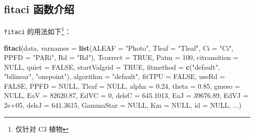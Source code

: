\documentclass[]{krantz}
\makeatletter
\newenvironment{Shaded}{\begin{snugshade}}{\end{snugshade}}
\newcommand{\KeywordTok}[1]{\textcolor[rgb]{0.13,0.29,0.53}{\textbf{#1}}}
\newcommand{\DataTypeTok}[1]{\textcolor[rgb]{0.13,0.29,0.53}{#1}}
\newcommand{\DecValTok}[1]{\textcolor[rgb]{0.00,0.00,0.81}{#1}}
\newcommand{\FloatTok}[1]{\textcolor[rgb]{0.00,0.00,0.81}{#1}}
\newcommand{\StringTok}[1]{\textcolor[rgb]{0.31,0.60,0.02}{#1}}
\newcommand{\OtherTok}[1]{\textcolor[rgb]{0.56,0.35,0.01}{#1}}
\newcommand{\NormalTok}[1]{#1}
\newenvironment{kframe}{%
\medskip{}
\setlength{\fboxsep}{.8em}
 \def\at@end@of@kframe{}%
 \ifinner\ifhmode%
  \def\at@end@of@kframe{\end{minipage}}%
  \begin{minipage}{\columnwidth}%
 \fi\fi%
 \def\FrameCommand##1{\hskip\@totalleftmargin \hskip-\fboxsep
 \colorbox{shadecolor}{##1}\hskip-\fboxsep
     \hskip-\linewidth \hskip-\@totalleftmargin \hskip\columnwidth}%
 \MakeFramed {\advance\hsize-\width
   \@totalleftmargin\z@ \linewidth\hsize
   \@setminipage}}%
 {\par\unskip\endMakeFramed%
 \at@end@of@kframe}
\renewenvironment{Shaded}{\begin{kframe}}{\end{kframe}}
\theoremstyle{definition}
\theoremstyle{definition}
\theoremstyle{definition}
\theoremstyle{remark}
\makeatother
\begin{document}
\subsection{fitaci 函数介绍}\label{fitaci_intro}

\texttt{fitaci} 的用法如下\footnote{仅针对 C3 植物}：

\begin{Shaded}
\begin{Highlighting}[]
\KeywordTok{fitaci}\NormalTok{(data, }\DataTypeTok{varnames =} \KeywordTok{list}\NormalTok{(}\DataTypeTok{ALEAF =} \StringTok{"Photo"}\NormalTok{, }
  \DataTypeTok{Tleaf =} \StringTok{"Tleaf"}\NormalTok{, }\DataTypeTok{Ci =} \StringTok{"Ci"}\NormalTok{, }\DataTypeTok{PPFD =} \StringTok{"PARi"}\NormalTok{, }
  \DataTypeTok{Rd =} \StringTok{"Rd"}\NormalTok{), }\DataTypeTok{Tcorrect =} \OtherTok{TRUE}\NormalTok{, }\DataTypeTok{Patm =} \DecValTok{100}\NormalTok{, }
  \DataTypeTok{citransition =} \OtherTok{NULL}\NormalTok{, }\DataTypeTok{quiet =} \OtherTok{FALSE}\NormalTok{, }
  \DataTypeTok{startValgrid =} \OtherTok{TRUE}\NormalTok{, }\DataTypeTok{fitmethod =} 
  \KeywordTok{c}\NormalTok{(}\StringTok{"default"}\NormalTok{, }\StringTok{"bilinear"}\NormalTok{, }\StringTok{"onepoint"}\NormalTok{), }
  \DataTypeTok{algorithm =} \StringTok{"default"}\NormalTok{, }\DataTypeTok{fitTPU =} \OtherTok{FALSE}\NormalTok{, }
  \DataTypeTok{useRd =} \OtherTok{FALSE}\NormalTok{, }\DataTypeTok{PPFD =} \OtherTok{NULL}\NormalTok{, }\DataTypeTok{Tleaf =} \OtherTok{NULL}\NormalTok{, }
  \DataTypeTok{alpha =} \FloatTok{0.24}\NormalTok{, }\DataTypeTok{theta =} \FloatTok{0.85}\NormalTok{, }\DataTypeTok{gmeso =} \OtherTok{NULL}\NormalTok{, }
  \DataTypeTok{EaV =} \FloatTok{82620.87}\NormalTok{, }\DataTypeTok{EdVC =} \DecValTok{0}\NormalTok{, }\DataTypeTok{delsC =} \FloatTok{645.1013}\NormalTok{,}
  \DataTypeTok{EaJ =} \FloatTok{39676.89}\NormalTok{, }\DataTypeTok{EdVJ =} \FloatTok{2e+05}\NormalTok{, }
  \DataTypeTok{delsJ =} \FloatTok{641.3615}\NormalTok{, }\DataTypeTok{GammaStar =} \OtherTok{NULL}\NormalTok{, }
  \DataTypeTok{Km =} \OtherTok{NULL}\NormalTok{, }\DataTypeTok{id =} \OtherTok{NULL}\NormalTok{, ...)}


\end{Highlighting}
\end{Shaded}
\end{document}
